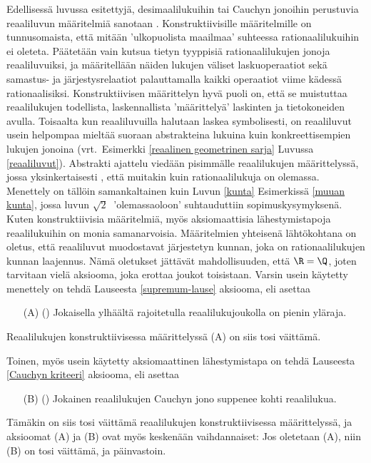 Edellisessä luvussa esitettyjä, desimaalilukuihin tai Cauchyn jonoihin perustuvia reaaliluvun 
määritelmiä sanotaan . Konstruktiivisille määritelmille on 
tunnusomaista, että mitään 'ulkopuolista maailmaa' suhteessa rationaalilukuihin ei oleteta. 
Päätetään vain kutsua tietyn tyyppisiä rationaalilukujen jonoja reaaliluvuiksi, ja määritellään
näiden lukujen väliset laskuoperaatiot sekä samastus- ja järjestysrelaatiot palauttamalla kaikki
operaatiot viime kädessä rationaalisiksi. Konstruktiivisen määrittelyn hyvä puoli on, että se 
muistuttaa reaalilukujen todellista, laskennallista 'määrittelyä' laskinten ja tietokoneiden 
avulla. Toisaalta kun reaaliluvuilla halutaan laskea symbolisesti, on reaaliluvut usein 
helpompaa mieltää suoraan abstrakteina lukuina kuin konkreettisempien lukujen jonoina 
(vrt.\ Esimerkki \ref{reaalinen geometrinen sarja} Luvussa \ref{reaaliluvut}). Abstrakti
ajattelu viedään pisimmälle reaalilukujen  määrittelyssä, jossa
yksinkertaisesti , että muitakin kuin rationaalilukuja on olemassa. Menettely on
tällöin samankaltainen kuin Luvun \ref{kunta} Esimerkissä \ref{muuan kunta}, jossa luvun
$\sqrt{2}\ $  'olemassaoloon' suhtauduttiin sopimuskysymyksenä. Kuten konstruktiivisia
määritelmiä, myös aksiomaattisia lähestymistapoja reaalilukuihin on monia samanarvoisia.
Määritelmien yhteisenä lähtökohtana on oletus, että reaaliluvut muodostavat järjestetyn kunnan,
joka on rationaalilukujen kunnan laajennus. Nämä oletukset jättävät mahdollisuuden, että
$\R = \Q$, joten tarvitaan vielä aksiooma, joka erottaa joukot toisistaan. Varsin usein
käytetty menettely on tehdä Lauseesta \ref{supremum-lause} aksiooma, eli asettaa
\begin{itemize}
\item[(A)] () Jokaisella ylhäältä rajoitetulla reaalilukujoukolla on 
           pienin yläraja.
\end{itemize}
Reaalilukujen konstruktiivisessa määrittelyssä (A) on siis tosi väittämä. 

Toinen, myös usein käytetty aksiomaattinen lähestymistapa on tehdä Lauseesta 
\ref{Cauchyn kriteeri} aksiooma, eli asettaa
\begin{itemize}
\item[(B)] () Jokainen reaalilukujen Cauchyn jono suppenee kohti 
           reaalilukua.
\end{itemize}
Tämäkin on siis tosi väittämä reaalilukujen konstruktiivisessa määrittelyssä, ja aksioomat (A)
ja (B) ovat myös keskenään vaihdannaiset: Jos oletetaan (A), niin (B) on tosi väittämä, ja 
päinvastoin.

